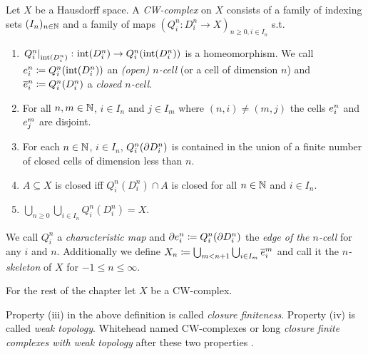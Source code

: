 \begin{defi}\label{defi:CWComplex2}
    Let $X$ be a Hausdorff space. 
    A \emph{CW-complex} on $X$ consists of a family of indexing sets $(I_n)_{n \in \bN}$ and a family of maps $(Q_i^n\colon D_i^n\rightarrow X)_{n \ge 0, i \in I_n}$ s.t.
    \begin{enumerate}
        \item $\restrict{Q_i^n}{\interior{D_i^n}}\colon \interior{D_i^n} \rightarrow Q_i^n(\interior{D_i^n})$ is a homeomorphism. We call $\ocell{n}{i} \coloneq Q_i^n(\interior{D_i^n})$ an \emph{(open) $n$-cell} (or a cell of dimension $n$) and $\ccell{n}{i} \coloneq Q_i^n(D_i^n)$ a \emph{closed $n$-cell}.
        \item For all $n, m \in \bN$, $i \in I_n$ and $j \in I_m$ where $(n, i) \ne (m, j)$ the cells $\ocell{n}{i}$ and $\ocell{m}{j}$ are disjoint.
        \item For each $n \in \bN$, $i \in I_n$, $Q_i^n(\boundary D_i^n)$ is contained in the union of a finite number of closed cells of dimension less than $n$.
        \item $A \subseteq X$ is closed iff $Q_i^n(D_i^n) \cap A$ is closed for all $n \in \bN$ and $i \in I_n$.
        \item $\bigcup_{n \ge 0}\bigcup_{i \in I_n} Q_i^n(D_i^n) = X$.
    \end{enumerate}
    We call $Q_i^n$ a \emph{characteristic map} and $\ecell{n}{i} \coloneq Q_i^n(\boundary D_i^n)$ the \emph{edge of the $n$-cell} for any $i$ and $n$.
    Additionally we define $X_n \coloneq \bigcup_{m < n + 1} \bigcup_{i \in I_m} \ccell{m}{i}$ and call it the \emph{$n$-skeleton} of $X$ for $-1 \le n \le \infty$.
\end{defi}


For the rest of the chapter let $X$ be a CW-complex.

\begin{rem}
    Property (iii) in the above definition is called \emph{closure finiteness}. 
    Property (iv) is called \emph{weak topology}.
    Whitehead named CW-complexes or long \emph{closure finite complexes with weak topology} after these two properties \cite{Whitehead2018}.
\end{rem}

